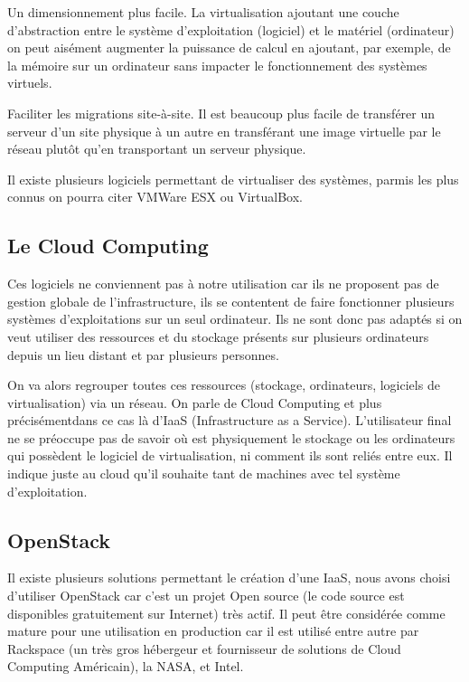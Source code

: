 \documentclass{report}
\begin{document}
Un dimensionnement plus facile. La virtualisation ajoutant une couche d’abstraction entre le système d’exploitation (logiciel) et le matériel (ordinateur) on peut aisément augmenter la puissance de calcul en ajoutant, par exemple, de la mémoire sur un ordinateur sans impacter le fonctionnement des systèmes virtuels.

Faciliter les migrations site-à-site. Il est beaucoup plus facile de transférer un serveur d’un site physique à un autre en transférant une image virtuelle par le réseau plutôt qu’en transportant un serveur physique.\newline

Il existe plusieurs logiciels permettant de virtualiser des systèmes, parmis les plus connus on pourra citer VMWare ESX ou VirtualBox.

\subsection{Le Cloud Computing}
Ces logiciels ne conviennent pas à notre utilisation car ils ne proposent pas de gestion globale de l’infrastructure, ils se contentent de faire fonctionner plusieurs systèmes d’exploitations sur un seul ordinateur. Ils ne sont donc pas adaptés si on veut utiliser des ressources et du stockage présents sur plusieurs ordinateurs depuis un lieu distant et par plusieurs personnes.

On va alors regrouper toutes ces ressources (stockage, ordinateurs, logiciels de virtualisation) via un réseau. On parle de Cloud Computing et plus précisément\footnotemark[1] dans ce cas là d’IaaS (Infrastructure as a Service).
L’utilisateur final ne se préoccupe pas de savoir où est physiquement le stockage ou les ordinateurs qui possèdent le logiciel de virtualisation, ni comment ils sont reliés entre eux. Il indique juste au cloud qu’il souhaite tant de machines avec tel système d’exploitation.


\subsection{OpenStack}
Il existe plusieurs solutions permettant le création d’une IaaS, nous avons choisi d’utiliser OpenStack car c’est un projet Open source (le code source est disponibles gratuitement sur Internet) très actif.
Il peut être considérée comme mature pour une utilisation en production car il est utilisé entre autre par Rackspace (un très gros hébergeur et fournisseur de solutions de Cloud Computing Américain), la NASA, et Intel.
\end{document}
